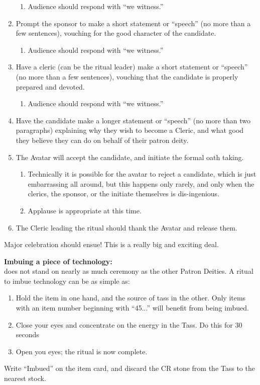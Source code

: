 \documentclass[green]{GL2020}
\begin{document}
\begin{enumerate}
\begin{enumerate}
      \item Audience should respond with ``we witness.''
    \end{enumerate}
    \item Prompt the sponsor to make a short statement or ``speech'' (no more than a few sentences), vouching for the good character of the candidate.
    \begin{enumerate}
      \item Audience should respond with ``we witness.''
    \end{enumerate}
    \item Have a cleric (can be the ritual leader) make a short statement or ``speech'' (no more than a few sentences), vouching that the candidate is properly prepared and devoted.
    \begin{enumerate}
      \item Audience should respond with ``we witness.''
    \end{enumerate}
    \item Have the candidate make a longer statement or ``speech'' (no more than two paragraphs) explaining why they wish to become a Cleric, and what good they believe they can do on behalf of their patron deity.
    \item The Avatar will accept the candidate, and initiate the formal oath taking.
    \begin{enumerate}
      \item Technically it is possible for the avatar to reject a candidate, which is just embarrassing all around, but this happens only rarely, and only when the clerics, the sponsor, or the initiate themselves is dis-ingenious.
      \item Applause is appropriate at this time.
    \end{enumerate}
    \item The Cleric leading the ritual should thank the Avatar and release them.
  \end{enumerate}
Major celebration should ensue! This is a really big and exciting deal.

\textbf{Imbuing a piece of technology:}\\
\cTechGod{} does not stand on nearly as much ceremony as the other Patron Deities. A ritual to imbue technology can be as simple as:

\begin{enumerate}
	\item Hold the item in one hand, and the source of tass in the other. Only items with an item number beginning with ``45...'' will benefit from being imbued.
	\item Close your eyes and concentrate on the energy in the Tass. Do this for 30 seconds
	\item Open you eyes; the ritual is now complete.
\end{enumerate}

Write ``Imbued'' on the item card, and discard the CR stone from the Tass to the nearest stock.
\end{document}
